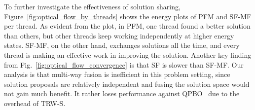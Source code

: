 %
%
To further investigate the effectiveness of solution sharing,
Figure~\ref{fig:optical_flow_by_threads} shows the energy plots of PFM
and SF-MF per thread. As evident from the plot, in PFM, one thread found
a better solution than others, but other threads keep working
independently at higher energy states. SF-MF, on the other hand,
exchanges solutions all the time, and every thread is making an effective
work in improving the solution.
Another key finding from Fig.~\ref{fig:optical_flow_convergence} is that
SF is slower than SF-MF. Our analysis is that multi-way fusion is
inefficient in this problem setting, since solution proposals are
relatively independent and fusing the solution space would not gain much
benefit. It rather loses performance against QPBO~\cite{QPBO} due to the
overhead of TRW-S.

